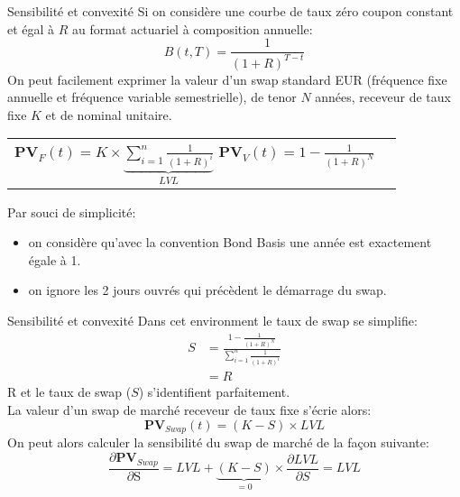 \documentclass{beamer}
\begin{document}
\begin{frame}{Sensibilité et convexité}
Si on considère une courbe de taux zéro coupon constant et égal à $R$ au format actuariel à composition annuelle:
\[
B(t,T)=\frac{1}{(1+R)^{T-t}}
\]
On peut facilement exprimer la valeur d'un swap standard EUR (fréquence fixe annuelle et fréquence variable semestrielle), de tenor $N$ années, receveur de taux fixe $K$ et de nominal unitaire.
\begin{center}
\begin{tabular}{c c} 
$\textbf{PV}_F(t) = K \times \underbrace{\sum_{i=1}^{n} \frac{1}{(1+R)^i}}_{LVL}$ 
$\textbf{PV}_V(t) = 1-\frac{1}{(1+R)^N}$
\end{tabular}
\end{center}
Par souci de simplicité:\\
\begin{itemize}
\item on considère qu'avec la convention Bond Basis une année est exactement égale à 1.
\item on ignore les 2 jours ouvrés qui précèdent le démarrage du swap.
\end{itemize}
\end{frame}

\begin{frame}{Sensibilité et convexité}
Dans cet environment le taux de swap se simplifie:
\[
\begin{split}
S&=\frac{1-\frac{1}{(1+R)^N}}{\sum_{i=1}^{n} \frac{1}{(1+R)^i}}\\
&=R
\end{split}
\]
R et le taux de swap ($S$) s'identifient parfaitement.\\
La valeur d'un swap de marché receveur de taux fixe s'écrie alors:
\[
\textbf{PV}_{Swap}(t)=(K-S) \times LVL 
\]
On peut alors calculer la sensibilité du swap de marché de la façon suivante:
\[
\frac{\partial \textbf{PV}_{Swap}}{\partial \text{S}}=LVL+\underbrace{(K-S)}_{=0} \times \frac{\partial LVL}{\partial S}=LVL 
\]

\end{frame}
\end{document}
